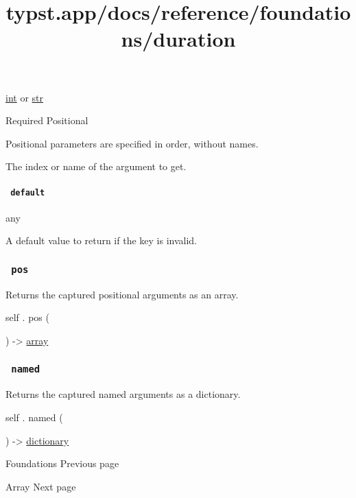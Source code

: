 \href{/docs/reference/foundations/int/}{int} {or}
\href{/docs/reference/foundations/str/}{str}

{Required} {{ Positional }}

\label{definitions-at-key-positional-tooltip}
Positional parameters are specified in order, without names.

The index or name of the argument to get.

\paragraph{\texorpdfstring{\texttt{\ default\ }}{ default }}\label{definitions-at-default}

{ any }

A default value to return if the key is invalid.

\subsubsection{\texorpdfstring{\texttt{\ pos\ }}{ pos }}\label{definitions-pos}

Returns the captured positional arguments as an array.

self { . } { pos } (

) -\textgreater{} \href{/docs/reference/foundations/array/}{array}

\subsubsection{\texorpdfstring{\texttt{\ named\ }}{ named }}\label{definitions-named}

Returns the captured named arguments as a dictionary.

self { . } { named } (

) -\textgreater{}
\href{/docs/reference/foundations/dictionary/}{dictionary}

\href{/docs/reference/foundations/}{\pandocbounded{}}

{ Foundations } { Previous page }

\href{/docs/reference/foundations/array/}{\pandocbounded{}}

{ Array } { Next page }


\title{typst.app/docs/reference/foundations/duration}

